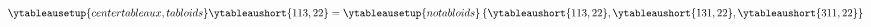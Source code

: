 \documentclass[crop,equation,convert={outext=.svg,command=\unexpanded{pdf2svg \infile\space\outfile}},multi=false]{standalone}
\begin{document}
\color{white}\Huge\boldmath
$\ytableausetup{centertableaux,tabloids} \ytableaushort{113,22} = \ytableausetup{notabloids}\left\lbrace\ytableaushort{113,22},\ytableaushort{131,22},\ytableaushort{311,22}\right\rbrace$
\end{document}
